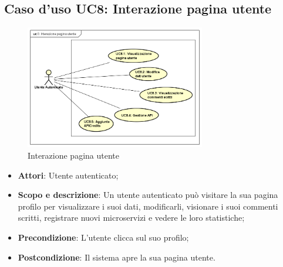 \documentclass[12pt,a4paper,titlepage]{article}
\begin{document}
	\subsection{Caso d'uso UC8: Interazione pagina utente}
	\label{UC8}
	\begin{figure}[H]
		\centering
		\includegraphics[width=0.7\textwidth]{UseCase/InterazionePaginaUtente}
		\caption{Interazione pagina utente}
	\end{figure}
	\begin{itemize}
		\item \textbf{Attori}: Utente autenticato;
		\item \textbf{Scopo e descrizione}: Un utente autenticato può visitare la sua pagina profilo per visualizzare i suoi dati, modificarli, visionare i suoi commenti scritti, registrare nuovi microservizi e vedere le loro statistiche;
		\item \textbf{Precondizione}: L'utente clicca sul suo profilo;
		\item \textbf{Postcondizione}: Il sistema apre la sua pagina utente.
	\end{itemize}
\end{document}
